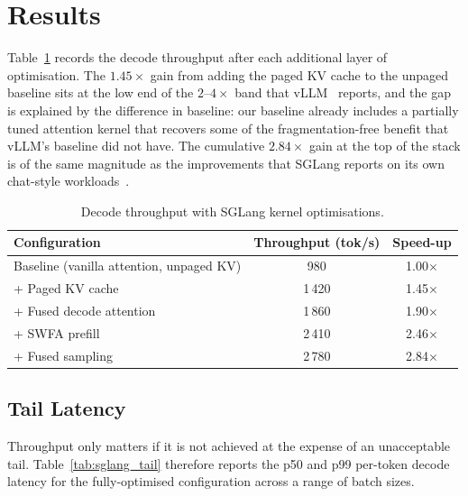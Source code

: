 \section{Results}\label{sec:sglang_results}
Table~\ref{tab:sglang_bench} records the decode throughput after
each additional layer of optimisation. The $1.45\times$ gain from
adding the paged KV cache to the unpaged baseline sits at the low
end of the $2$--$4\times$ band that vLLM~\cite{vllm} reports, and
the gap is explained by the difference in baseline: our baseline
already includes a partially tuned attention kernel that recovers
some of the fragmentation-free benefit that vLLM's baseline did
not have. The cumulative $2.84\times$ gain at the top of the
stack is of the same magnitude as the improvements that SGLang
reports on its own chat-style workloads~\cite{sglang}.

\begin{table}[h]
\centering
\caption{Decode throughput with SGLang kernel optimisations.}
\label{tab:sglang_bench}
\begin{tabular}{lcc}
\toprule
\textbf{Configuration}                        & \textbf{Throughput (tok/s)} & \textbf{Speed-up} \\
\midrule
Baseline (vanilla attention, unpaged KV)      &  980 & 1.00$\times$ \\
+ Paged KV cache                              & 1\,420 & 1.45$\times$ \\
+ Fused decode attention                      & 1\,860 & 1.90$\times$ \\
+ SWFA prefill                                & 2\,410 & 2.46$\times$ \\
+ Fused sampling                              & 2\,780 & 2.84$\times$ \\
\bottomrule
\end{tabular}
\end{table}

\subsection{Tail Latency}\label{sec:sglang_tail}
Throughput only matters if it is not achieved at the expense of
an unacceptable tail. Table~\ref{tab:sglang_tail} therefore
reports the p50 and p99 per-token decode latency for the
fully-optimised configuration across a range of batch sizes.

